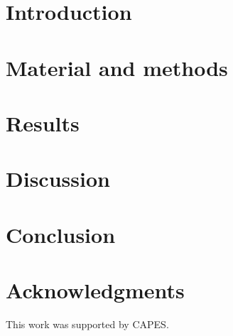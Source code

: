\documentclass[a4paper,fleqn]{cas-dc}
\begin{document}
\let\WriteBookmarks\relax
\def\floatpagepagefraction{1}
\def\textpagefraction{.001}



\maketitle

\section{Introduction} %


\section{Material and methods}
\label{ch:metodologia}


\section{Results}
\label{ch:resultados}


\section{Discussion}
\label{ch:discussao}


\section{Conclusion}
\label{ch:conclusao}


\section{Acknowledgments}
\label{ch:acknowledgments}

This work was supported by CAPES.

%



\end{document}
